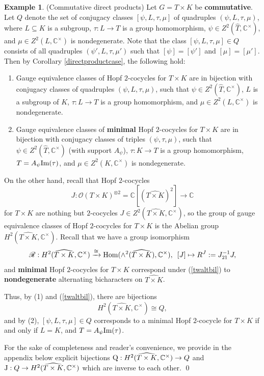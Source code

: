 \documentclass{amsart}
\theoremstyle{definition}
\newtheorem{example}[theorem]{Example}
\newcommand{\Hom}{{\rm Hom}}
\renewcommand{\O}{\mathscr{O}}
\newcommand{\ot}{\otimes}
\numberwithin{equation}{section}
\begin{document}
\begin{example}(Commutative direct products) \label{directprodAbuctcase}
Let $G=T\times K$ be {\bf commutative}. Let $Q$ denote the set of conjugacy classes $[\psi,L,\tau,\mu]$ of quadruples $(\psi,L,\tau,\mu)$, where $L\subseteq K$ is a subgroup, $\tau: L\to T$ is a group homomorphism, $\psi\in Z^2(\widehat{T},\mathbb{C}^{\times})$, and $\mu\in Z^2(L,\mathbb{C}^{\times})$ is nondegenerate. Note that the class $[\psi,L,\tau,\mu]\in Q$ consists of all quadruples $(\psi',L,\tau,\mu')$ such that $[\psi]=[\psi']$ and $[\mu]=[\mu']$. 
Then by Corollary \ref{directproductcase}, the following hold:
\begin{enumerate}
\item
Gauge equivalence classes of Hopf $2$-cocycles for $T\times K$ are in bijection with conjugacy classes of quadruples $(\psi,L,\tau,\mu)$, such that $\psi\in Z^2(\widehat{T},\mathbb{C}^{\times})$, $L$ is a subgroup of $K$, $\tau:L\to T$ is a group homomorphism, and $\mu\in Z^2(L,\mathbb{C}^{\times})$ is nondegenerate.
\item
Gauge equivalence classes of {\bf minimal} Hopf $2$-cocycles for $T\times K$ are in bijection with conjugacy classes of triples $(\psi,\tau,\mu)$, such that $\psi\in Z^2(\widehat{T},\mathbb{C}^{\times})$ (with support $A_{\psi}$), $\tau:K\to T$ is a group homomorphism, $T=A_{\psi}{\rm Im}(\tau)$, and $\mu\in Z^2(K,\mathbb{C}^{\times})$ is nondegenerate.
\end{enumerate}

On the other hand, recall \cite{G2} that Hopf $2$-cocycles 
$$J:\O(T\times K)^{\ot 2}=\mathbb{C}[(\widehat{T\times K})^{2}]\to \mathbb{C}$$
for $T\times K$ are nothing but $2$-cocycles $J\in Z^2(\widehat{T\times K},\mathbb{C}^{\times})$, so 
the group of gauge equivalence classes of Hopf $2$-cocycles for $T\times K$
is the Abelian group $H^2(\widehat{T\times K},\mathbb{C}^{\times})$. Recall that we have a group isomorphism  
\begin{equation}\label{twaltbil}
\mathscr{R}:H^2(\widehat{T\times K},\mathbb{C}^{\times})\xrightarrow{\cong}\Hom(\wedge^2(\widehat{T\times K}),\mathbb{C}^{\times}),\,\,\,[J]\mapsto R^J:=J_{21}^{-1}J,
\end{equation}
and {\bf minimal} Hopf $2$-cocycles for $T\times K$ correspond under (\ref{twaltbil}) to {\bf nondegenerate} alternating bicharacters on $\widehat{T\times K}$.

Thus, by (1) and (\ref{twaltbil}), there are bijections
\begin{equation}\label{onehand}
H^2(\widehat{T\times K},\mathbb{C}^{\times})\cong Q,
\end{equation}
and by (2), $[\psi,L,\tau,\mu]\in Q$ corresponds to a minimal Hopf $2$-cocycle for $T\times K$ if and only if $L=K$, and $T=A_{\psi}{\rm Im}(\tau)$. 

For the sake of completeness and reader's convenience, we provide in the appendix below explicit bijections ${\rm Q}:H^2(\widehat{T\times K},\mathbb{C}^{\times})\to Q$ and ${\rm J}:Q\to H^2(\widehat{T\times K},\mathbb{C}^{\times})$ which are inverse to each other. \qed
\end{example}
\end{document}
